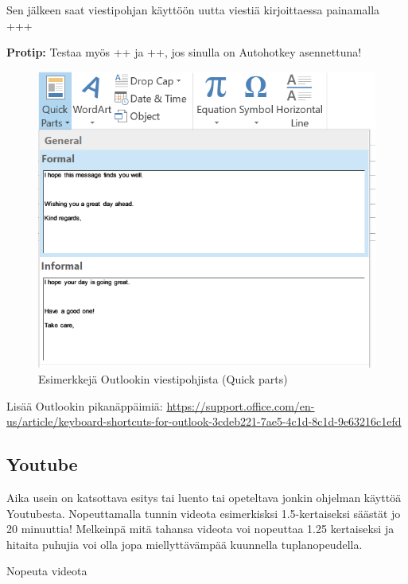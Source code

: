 \documentclass[a4paper,12pt]{scrartcl}
\begin{document}
Sen jälkeen saat viestipohjan käyttöön uutta viestiä kirjoittaessa painamalla \\ +++\keys{\return}

\textbf{Protip:} Testaa myös \keys{\ctrl}++ ja \keys{\ctrl}++, jos sinulla on Autohotkey asennettuna!

\begin{figure}[H]
	\includegraphics[width=\linewidth]{Quick_parts.png}
	\caption{Esimerkkejä Outlookin viestipohjista (Quick parts)}
	\label{fig:Quick_parts}
\end{figure}

\medskip

Lisää Outlookin pikanäppäimiä: \url{https://support.office.com/en-us/article/keyboard-shortcuts-for-outlook-3cdeb221-7ae5-4c1d-8c1d-9e63216c1efd}

\subsection{Youtube}

Aika usein on katsottava esitys tai luento tai opeteltava jonkin ohjelman käyttöä Youtubesta. Nopeuttamalla tunnin videota esimerkisksi 1.5-kertaiseksi säästät jo 20 minuuttia! Melkeinpä mitä tahansa videota voi nopeuttaa 1.25 kertaiseksi ja hitaita puhujia voi olla jopa miellyttävämpää kuunnella tuplanopeudella.

 Nopeuta videota
\end{document}
